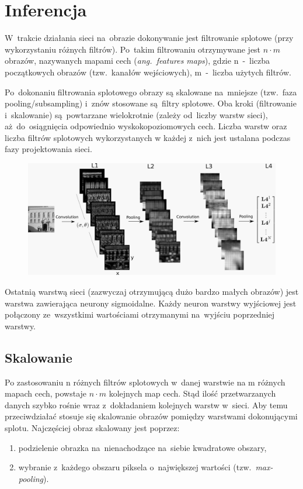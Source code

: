 \section{Inferencja}
W~trakcie działania sieci na~obrazie dokonywanie jest filtrowanie splotowe (przy wykorzystaniu różnych
filtrów). Po~takim filtrowaniu otrzymywane jest $n\cdot m$ obrazów, nazywanych mapami cech
(\textit{ang.~features maps}), gdzie n~-~liczba początkowych obrazów (tzw.~kanałów wejściowych), m~-~liczba
użytych filtrów.

Po~dokonaniu filtrowania splotowego obrazy są skalowane na~mniejsze (tzw.~faza pooling/subsampling) i~znów
stosowane są~filtry splotowe. Oba kroki (filtrowanie i~skalowanie) są~powtarzane wielokrotnie
(zależy od~liczby warstw sieci), aż~do~osiągnięcia odpowiednio wyskokopoziomowych cech. Liczba warstw oraz
liczba filtrów splotowych wykorzystanych w każdej z~nich jest ustalana podczas fazy projektowania sieci.

\begin{figure}[H]
	\centering
	\includegraphics[width=\linewidth]{img/convnet.png}
\end{figure}

Ostatnią warstwą sieci (zazwyczaj otrzymującą dużo bardzo małych obrazów) jest warstwa zawierająca neurony
sigmoidalne. Każdy neuron warstwy wyjściowej jest połączony ze~wszystkimi wartościami otrzymanymi na~wyjściu
poprzedniej warstwy.

\subsection{Skalowanie}
Po zastosowaniu n różnych filtrów splotowych w~danej warstwie na m różnych mapach cech, powstaje $n\cdot m$
kolejnych map cech. Stąd ilość przetwarzanych danych szybko rośnie wraz z~dokładaniem kolejnych warstw
w~sieci. Aby temu przeciwdziałać stosuje się skalowanie obrazów pomiędzy warstwami dokonującymi splotu.
Najczęściej obraz skalowany jest poprzez:
\begin{enumerate}
  \item podzielenie obrazka na~nienachodzące na~siebie kwadratowe obszary,
  \item wybranie z~każdego obszaru piksela o~największej wartości (tzw.~\textit{max-pooling}). 
\end{enumerate}

